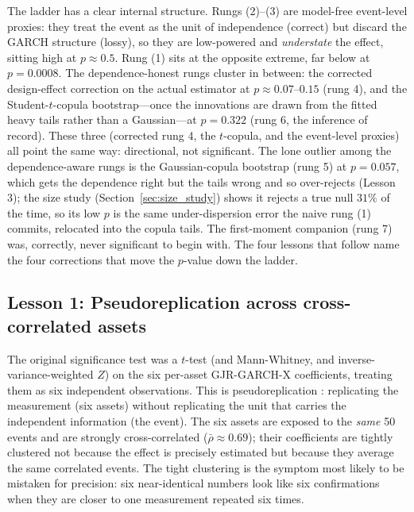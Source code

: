 \documentclass[pdflatex,sn-mathphys-num]{sn-jnl}
\theoremstyle{thmstyleone}
\theoremstyle{thmstyletwo}
\theoremstyle{thmstylethree}
\begin{document}
The ladder has a clear internal structure. Rungs (2)--(3) are model-free event-level proxies: they treat the event as the unit of independence (correct) but discard the GARCH structure (lossy), so they are low-powered and \emph{understate} the effect, sitting high at $p\approx 0.5$. Rung (1) sits at the opposite extreme, far below at $p=0.0008$. The dependence-honest rungs cluster in between: the corrected design-effect correction on the actual estimator at $p\approx 0.07$--$0.15$ (rung 4), and the Student-$t$-copula bootstrap---once the innovations are drawn from the fitted heavy tails rather than a Gaussian---at $p=0.322$ (rung 6, the inference of record). These three (corrected rung 4, the $t$-copula, and the event-level proxies) all point the same way: directional, not significant. The lone outlier among the dependence-aware rungs is the Gaussian-copula bootstrap (rung 5) at $p=0.057$, which gets the dependence right but the tails wrong and so over-rejects (Lesson 3); the size study (Section~\ref{sec:size_study}) shows it rejects a true null $31\%$ of the time, so its low $p$ is the same under-dispersion error the naive rung (1) commits, relocated into the copula tails. The first-moment companion (rung 7) was, correctly, never significant to begin with. The four lessons that follow name the four corrections that move the $p$-value down the ladder.

\subsection{Lesson 1: Pseudoreplication across cross-correlated assets}\label{sec:lesson1}

The original significance test was a $t$-test (and Mann-Whitney, and inverse-variance-weighted $Z$) on the six per-asset GJR-GARCH-X coefficients, treating them as six independent observations. This is pseudoreplication \citep{hurlbert1984pseudoreplication}: replicating the measurement (six assets) without replicating the unit that carries the independent information (the event). The six assets are exposed to the \emph{same} 50 events and are strongly cross-correlated ($\bar\rho\approx 0.69$); their coefficients are tightly clustered not because the effect is precisely estimated but because they average the same correlated events. The tight clustering is the symptom most likely to be mistaken for precision: six near-identical numbers look like six confirmations when they are closer to one measurement repeated six times.
\end{document}
